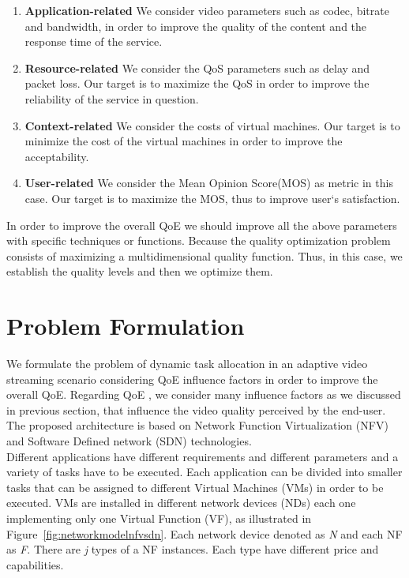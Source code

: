 \documentclass[a4paper]{article}
\begin{document}
\begin{enumerate}
\item \textbf{Application-related} 
We consider video parameters such as codec, bitrate and bandwidth, in order to improve the quality of the content and the response time of the service. \\

\item \textbf{Resource-related} 
We consider the QoS parameters such as delay and packet loss. Our target is to maximize the QoS in order to improve the reliability of the service in question. \\

\item \textbf{Context-related} 
We consider the costs of virtual machines. Our target is to minimize the cost of the virtual machines in order to improve the acceptability. \\
\item  \textbf{User-related} 
We consider the Mean Opinion Score(MOS) as metric in this case. Our target is to maximize the MOS, thus to improve user`s satisfaction.\\

\end{enumerate}
In order to improve the overall QoE we should improve all the above parameters with specific techniques or functions. Because the quality optimization problem consists of maximizing a multidimensional quality function. Thus, in this case, we establish the quality levels and then we optimize them. 

\section{Problem Formulation}
We formulate the problem of dynamic task allocation in an adaptive video streaming scenario considering QoE influence factors in order to improve the overall QoE. Regarding QoE , we consider many influence factors as we discussed in previous section, that influence the video quality perceived by the end-user.  The proposed architecture is based on Network Function Virtualization (NFV) and Software Defined network (SDN) technologies. \\

Different applications have different requirements and different parameters and a variety of tasks have to be executed. Each application can be divided into smaller tasks that can be assigned to different Virtual Machines (VMs) in order to be executed. VMs are installed in different network devices (NDs) each one implementing only one Virtual Function (VF), as illustrated in Figure~\ref{fig:networkmodelnfvsdn}. Each network device denoted as \textit{N} and each NF as \textit{F}. There are \textit{j} types of a NF instances. Each type have different price and capabilities. \\ 
\end{document}
